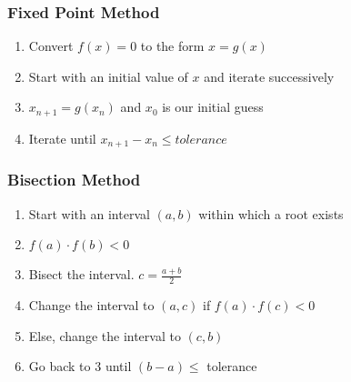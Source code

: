 \documentclass[14pt,compress]{beamer}
\begin{document}
\begin{frame}[fragile]
\frametitle{Fixed Point Method}
\begin{enumerate}
\item Convert $f(x)=0$ to the form $x=g(x)$
\item Start with an initial value of $x$ and iterate successively
\item $x_{n+1}=g(x_n)$ and $x_0$ is our initial guess
\item Iterate until $x_{n+1}-x_n \le tolerance$
\end{enumerate}
\end{frame}


\begin{frame}[fragile]
\frametitle{Bisection Method}
\begin{enumerate}
\item Start with an interval $(a, b)$ within which a root exists
\item $f(a)\cdot f(b) < 0$
\item Bisect the interval. $c = \frac{a+b}{2}$
\item Change the interval to $(a, c)$ if $f(a)\cdot f(c) < 0$
\item Else, change the interval to $(c, b)$
\item Go back to 3 until $(b-a) \le$ tolerance
\end{enumerate}
\end{frame}

\end{document}
